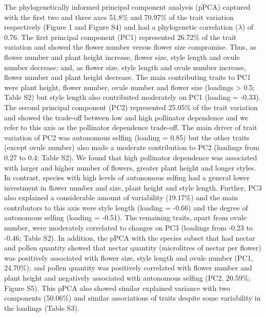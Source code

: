 \documentclass[12pt,a4paper,]{article}
\begin{document}
The phylogenetically informed principal component analysis (pPCA)
captured with the first two and three axes 51.8\% and 70.97\% of the
trait variation respectively (Figure 1 and Figure S4) and had a
phylogenetic correlation (\(\lambda\)) of 0.76. The first principal
component (PC1) represented 26.72\% of the trait variation and showed
the flower number versus flower size compromise. Thus, as flower number
and plant height increase, flower size, style length and ovule number
decrease; and, as flower size, style length and ovule number increase,
flower number and plant height decrease. The main contributing traits to
PC1 were plant height, flower number, ovule number and flower size
(loadings \textgreater{} \textbar{}0.5\textbar{}; Table S2) but style
length also contributed moderately on PC1 (loading = -0.33). The second
principal component (PC2) represented 25.05\% of the trait variation and
showed the trade-off between low and high pollinator dependence and we
refer to this axis as the pollinator dependence trade-off. The main
driver of trait variation of PC2 was autonomous selfing (loading = 0.85)
but the other traits (except ovule number) also made a moderate
contribution to PC2 (loadings from 0.27 to 0.4; Table S2). We found that
high pollinator dependence was associated with larger and higher number
of flowers, greater plant height and longer styles. In contrast, species
with high levels of autonomous selfing had a general lower investment in
flower number and size, plant height and style length. Further, PC3 also
explained a considerable amount of variability (19.17\%) and the main
contributors to this axis were style length (loading = -0.66) and the
degree of autonomous selfing (loading = -0.51). The remaining traits,
apart from ovule number, were moderately correlated to changes on PC3
(loadings from -0.23 to -0.46; Table S2). In addition, the pPCA with the
species subset that had nectar and pollen quantity showed that nectar
quantity (microlitres of nectar per flower) was positively associated
with flower size, style length and ovule number (PC1, 24.70\%); and
pollen quantity was positively correlated with flower number and plant
height and negatively associated with autonomous selfing (PC2, 20.59\%;
Figure S5). This pPCA also showed similar explained variance with two
components (50.06\%) and similar associations of traits despite some
variability in the loadings (Table S3).
\end{document}
